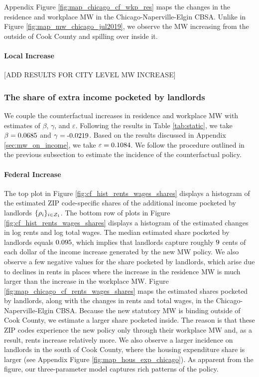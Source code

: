 Appendix Figure \ref{fig:map_chicago_cf_wkp_res} maps the changes in the 
residence and workplace MW in the Chicago-Naperville-Elgin CBSA.
Unlike in Figure \ref{fig:map_mw_chicago_jul2019}, we observe the MW increasing 
from the outside of Cook County and spilling over inside it.

\paragraph{Local Increase}
[ADD RESULTS FOR CITY LEVEL MW INCREASE]

\subsubsection*{The share of extra income pocketed by landlords}
\label{sec:cf_rents_and_wage_changes}

We couple the counterfactual increases in residence and workplace MW with 
estimates of $\beta$, $\gamma$, and $\varepsilon$.
Following the results in Table \ref{tab:static}, we take 
$\beta = \textnormal{0.0685}$ and 
$\gamma = \textnormal{-0.0219}$.
Based on the results discussed in Appendix \ref{sec:mw_on_income}, we take
$\varepsilon = \textnormal{0.1084}$.
We follow the procedure outlined in the previous subsection to estimate the 
incidence of the counterfactual policy.

\paragraph{Federal Increase}
The top plot in Figure \ref{fig:cf_hist_rents_wages_shares} displays a histogram 
of the estimated ZIP code-specific shares of the additional income pocketed by 
landlords $\{\rho_i\}_{i\in\mathcal{Z}_1}$.
The bottom row of plots in Figure \ref{fig:cf_hist_rents_wages_shares} displays 
a histogram of the estimated changes in log rents and log total wages.
The median estimated share pocketed by landlords equals $\textnormal{0.095}$, 
which implies that landlords capture roughly $\textnormal{9}$ cents of 
each dollar of the income increase generated by the new MW policy.
We also observe a few negative values for the share pocketed by landlords, which
arise due to declines in rents in places where the increase in the residence MW
is much larger than the increase in the workplace MW.
Figure \ref{fig:map_chicago_cf_rents_wages_shares} maps the estimated shares 
pocketed by landlords, along with the changes in rents and total wages, in the 
Chicago-Naperville-Elgin CBSA.
Because the new statutory MW is binding outside of Cook County, we estimate 
a larger share pocketed inside.
The reason is that these ZIP codes experience the new policy only through
their workplace MW and, as a result, rents increase relatively more.
We also observe a larger incidence on landlords in the south of Cook County,
where the housing expenditure share is larger 
(see Appendix Figure \ref{fig:map_hous_exp_chicago}).
As apparent from the figure, our three-parameter model captures rich patterns
of the policy.

